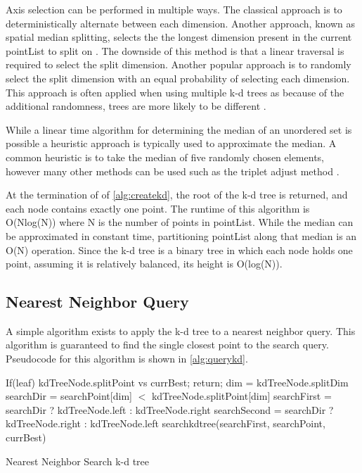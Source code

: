 Axis selection can be performed in multiple ways.  The classical approach is to deterministically alternate between each dimension.  Another approach, known as spatial median splitting, selects the the longest dimension present in the current pointList to split on \citep{zhou2008real}.  The downside of this method is that a linear traversal is required to select the split dimension.  Another popular approach is to randomly select the split dimension with an equal probability of selecting each dimension.  This approach is often applied when using multiple k-d trees as because of the additional randomness, trees are more likely to be different \citep{flann_pami_2014}.

While a linear time algorithm for determining the median of an unordered set is possible \citep{megiddo1984linear} a heuristic approach is typically used to approximate the median.  A common heuristic is to take the median of five randomly chosen elements, however many other methods can be used such as the triplet adjust method \citep{battiato2000efficient}.

At the termination of of \ref{alg:createkd}, the root of the k-d tree is returned, and each node contains exactly one point.  The runtime of this algorithm is O(Nlog(N)) where N is the number of points in pointList.  While the median can be approximated in constant time, partitioning pointList along that median is an O(N) operation.  Since the k-d tree is a binary tree in which each node holds one point, assuming it is relatively balanced, its height is O(log(N)).

\subsection{Nearest Neighbor Query}

A simple algorithm exists to apply the k-d tree to a nearest neighbor query.  This algorithm is guaranteed to find the single closest point to the search query.  Pseudocode for this algorithm is shown in \ref{alg:querykd}.

\begin{algorithm}
\begin{algorithmic}
	\State If(leaf) kdTreeNode.splitPoint vs currBest; return;
	\State dim = kdTreeNode.splitDim
	\State searchDir = searchPoint[dim] $<$ kdTreeNode.splitPoint[dim]
	\State searchFirst = searchDir ? kdTreeNode.left : kdTreeNode.right
	\State searchSecond = searchDir ? kdTreeNode.right : kdTreeNode.left
	\State searchkdtree(searchFirst, searchPoint, currBest)
	\State

\EndFunction
\end{algorithmic}
\caption{Nearest Neighbor Search k-d tree}
\label{alg:querykd}
\end{algorithm}


